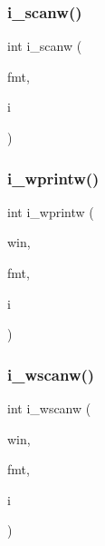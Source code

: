 \mbox{\label{C-macros_8c_a753154950200b717bb172493ec09eca0}} 
\subsubsection{\texorpdfstring{i\+\_\+scanw()}{i\_scanw()}}
{\footnotesize\ttfamily int i\+\_\+scanw (\begin{DoxyParamCaption}\item[{char $\ast$}]{fmt,  }\item[{int $\ast$}]{i }\end{DoxyParamCaption})}

\mbox{\label{C-macros_8c_a8e0a315d5abc4f7b87f2b272c20d866d}} 
\subsubsection{\texorpdfstring{i\+\_\+wprintw()}{i\_wprintw()}}
{\footnotesize\ttfamily int i\+\_\+wprintw (\begin{DoxyParamCaption}\item[{W\+I\+N\+D\+OW $\ast$}]{win,  }\item[{const char $\ast$}]{fmt,  }\item[{int}]{i }\end{DoxyParamCaption})}

\mbox{\label{C-macros_8c_a3fcdb7ea0752fda8505aa52f2306619f}} 
\subsubsection{\texorpdfstring{i\+\_\+wscanw()}{i\_wscanw()}}
{\footnotesize\ttfamily int i\+\_\+wscanw (\begin{DoxyParamCaption}\item[{W\+I\+N\+D\+OW $\ast$}]{win,  }\item[{char $\ast$}]{fmt,  }\item[{int $\ast$}]{i }\end{DoxyParamCaption})}

